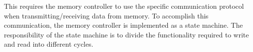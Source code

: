 This requires the memory controller to use the specific communication protocol when transmitting/receiving data from memory. To accomplish this communication, the memory controller is implemented as a state machine. The responsibility of the state machine is to divide the functionality required to write and read into different cycles. 




 








